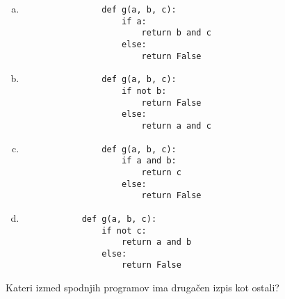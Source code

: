 \documentclass[arhiv, 10pt]{../izpit}
\begin{document}
        \begin{multicols}{2}
        \begin{enumerate}[(a)]
\item 
                \begin{verbatim}
                def g(a, b, c):
                    if a:
                        return b and c
                    else:
                        return False
                \end{verbatim}
            
\item 
                \begin{verbatim}
                def g(a, b, c):
                    if not b:
                        return False
                    else:
                        return a and c
                \end{verbatim}
            
\item 
                \begin{verbatim}
                def g(a, b, c):
                    if a and b:
                        return c
                    else:
                        return False
                \end{verbatim}
            
\item 
            \begin{verbatim}
            def g(a, b, c):
                if not c:
                    return a and b
                else:
                    return False
            \end{verbatim}
        
\end{enumerate}

        \end{multicols}
    
        \naloga*
        
        Kateri izmed spodnjih programov ima drugačen izpis kot ostali?
    
\end{document}
